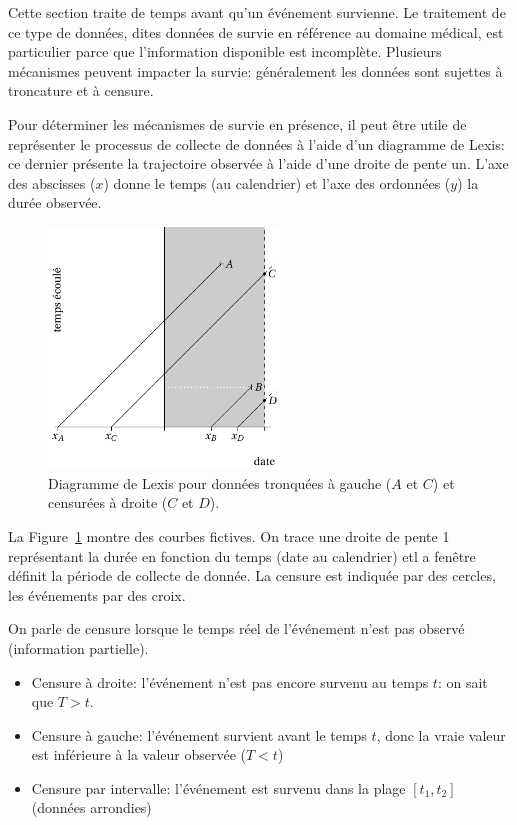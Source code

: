 \documentclass[
  11pt,
  letterpaper,
]{scrbook}
\providecommand{\tightlist}{%
  \setlength{\itemsep}{0pt}\setlength{\parskip}{0pt}}\usepackage{longtable,booktabs,array}
\theoremstyle{definition}
\theoremstyle{remark}
\begin{document}
Cette section traite de temps avant qu'un événement survienne. Le
traitement de ce type de données, dites données de survie en référence
au domaine médical, est particulier parce que l'information disponible
est incomplète. Plusieurs mécanismes peuvent impacter la survie:
généralement les données sont sujettes à troncature et à censure.

Pour déterminer les mécanismes de survie en présence, il peut être utile
de représenter le processus de collecte de données à l'aide d'un
diagramme de Lexis: ce dernier présente la trajectoire observée à l'aide
d'une droite de pente un. L'axe des abscisses (\(x\)) donne le temps (au
calendrier) et l'axe des ordonnées (\(y\)) la durée observée.

\begin{figure}[ht!]

{\centering \includegraphics[width=0.55\textwidth,height=\textheight]{./figures/Lexis_censure.pdf}

}

\caption{\label{fig-lexis}Diagramme de Lexis pour données tronquées à
gauche (\(A\) et \(C\)) et censurées à droite (\(C\) et \(D\)).}

\end{figure}

La Figure~\ref{fig-lexis} montre des courbes fictives. On trace une
droite de pente 1 représentant la durée en fonction du temps (date au
calendrier) etl a fenêtre définit la période de collecte de donnée. La
censure est indiquée par des cercles, les événements par des croix.

On parle de censure lorsque le temps réel de l'événement n'est pas
observé (information partielle).

\begin{itemize}
\tightlist
\item
  Censure à droite: l'événement n'est pas encore survenu au temps \(t\):
  on sait que \(T > t\).
\item
  Censure à gauche: l'événement survient avant le temps \(t\), donc la
  vraie valeur est inférieure à la valeur observée (\(T < t\))
\item
  Censure par intervalle: l'événement est survenu dans la plage
  \([t_1, t_2]\) (données arrondies)
\end{itemize}
\end{document}

